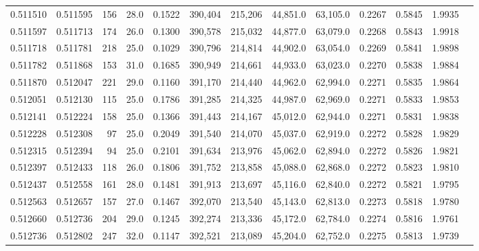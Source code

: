 \begin{tabular}{rrrrrrrrrrrrr}
0.511510 & 0.511595 &   156 & 28.0 &                                     0.1522 & 390,404 & 215,206 &  44,851.0 &  63,105.0 & 0.2267 & 0.5845 & 1.9935 \\
0.511597 & 0.511713 &   174 & 26.0 &                                     0.1300 & 390,578 & 215,032 &  44,877.0 &  63,079.0 & 0.2268 & 0.5843 & 1.9918 \\
0.511718 & 0.511781 &   218 & 25.0 &                                     0.1029 & 390,796 & 214,814 &  44,902.0 &  63,054.0 & 0.2269 & 0.5841 & 1.9898 \\
0.511782 & 0.511868 &   153 & 31.0 &                                     0.1685 & 390,949 & 214,661 &  44,933.0 &  63,023.0 & 0.2270 & 0.5838 & 1.9884 \\
0.511870 & 0.512047 &   221 & 29.0 &                                     0.1160 & 391,170 & 214,440 &  44,962.0 &  62,994.0 & 0.2271 & 0.5835 & 1.9864 \\
0.512051 & 0.512130 &   115 & 25.0 &                                     0.1786 & 391,285 & 214,325 &  44,987.0 &  62,969.0 & 0.2271 & 0.5833 & 1.9853 \\
0.512141 & 0.512224 &   158 & 25.0 &                                     0.1366 & 391,443 & 214,167 &  45,012.0 &  62,944.0 & 0.2271 & 0.5831 & 1.9838 \\
0.512228 & 0.512308 &    97 & 25.0 &                                     0.2049 & 391,540 & 214,070 &  45,037.0 &  62,919.0 & 0.2272 & 0.5828 & 1.9829 \\
0.512315 & 0.512394 &    94 & 25.0 &                                     0.2101 & 391,634 & 213,976 &  45,062.0 &  62,894.0 & 0.2272 & 0.5826 & 1.9821 \\
0.512397 & 0.512433 &   118 & 26.0 &                                     0.1806 & 391,752 & 213,858 &  45,088.0 &  62,868.0 & 0.2272 & 0.5823 & 1.9810 \\
0.512437 & 0.512558 &   161 & 28.0 &                                     0.1481 & 391,913 & 213,697 &  45,116.0 &  62,840.0 & 0.2272 & 0.5821 & 1.9795 \\
0.512563 & 0.512657 &   157 & 27.0 &                                     0.1467 & 392,070 & 213,540 &  45,143.0 &  62,813.0 & 0.2273 & 0.5818 & 1.9780 \\
0.512660 & 0.512736 &   204 & 29.0 &                                     0.1245 & 392,274 & 213,336 &  45,172.0 &  62,784.0 & 0.2274 & 0.5816 & 1.9761 \\
0.512736 & 0.512802 &   247 & 32.0 &                                     0.1147 & 392,521 & 213,089 &  45,204.0 &  62,752.0 & 0.2275 & 0.5813 & 1.9739 \\

\end{tabular}
